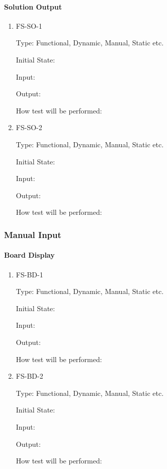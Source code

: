 \documentclass[11pt]{article}
\begin{document}
\paragraph{Solution Output}

\begin{enumerate}

\item{FS-SO-1\\}

Type: Functional, Dynamic, Manual, Static etc.
					
Initial State: 
					
Input: 
					
Output: 
					
How test will be performed: 
					
\item{FS-SO-2\\}

Type: Functional, Dynamic, Manual, Static etc.
					
Initial State: 
					
Input: 
					
Output: 
					
How test will be performed: 

\end{enumerate}

\subsubsection{Manual Input}

\paragraph{Board Display}

\begin{enumerate}

\item{FS-BD-1\\}

Type: Functional, Dynamic, Manual, Static etc.
					
Initial State: 
					
Input: 
					
Output: 
					
How test will be performed: 
					
\item{FS-BD-2\\}

Type: Functional, Dynamic, Manual, Static etc.
					
Initial State: 
					
Input: 
					
Output: 
					
How test will be performed: 

\end{enumerate}
\end{document}
